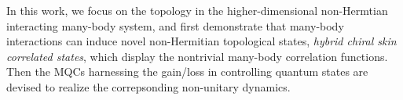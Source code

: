 \documentclass[longbibliography, aps, prx, amsmath, amssymb, amsfonts, twocolumn,superscriptaddress, footinbib]{revtex4-1}
\begin{document}
	


	In this work, 
	we focus on the topology in the higher-dimensional non-Hermtian interacting many-body system, and first demonstrate that many-body interactions can induce novel non-Hermitian topological states, \textit{hybrid chiral skin correlated states}, which display the nontrivial many-body correlation functions. Then the MQCs harnessing the gain/loss in controlling quantum states are devised to realize the correpsonding non-unitary dynamics. {\color{blue}{The MQC is composed of unitary gates, and generalized measurements implemented by an additional ancillary qubit, which is adapted to general systems.}}
	
\end{document}
